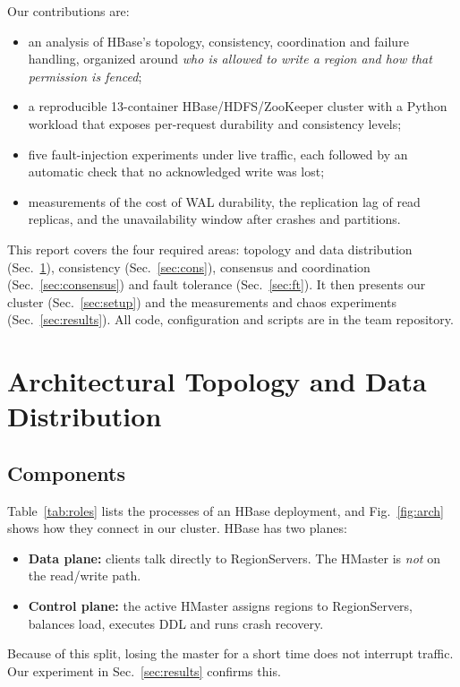 \documentclass[10pt,twocolumn,letterpaper]{article}
\begin{document}
Our contributions are:
\begin{itemize}
\item an analysis of HBase's topology, consistency, coordination and failure handling, organized around \emph{who is allowed to write a region and how that permission is fenced};
\item a reproducible 13-container HBase/HDFS/ZooKeeper cluster with a Python workload that exposes per-request durability and consistency levels;
\item five fault-injection experiments under live traffic, each followed by an automatic check that no acknowledged write was lost;
\item measurements of the cost of WAL durability, the replication lag of read replicas, and the unavailability window after crashes and partitions.
\end{itemize}

This report covers the four required areas: topology and data distribution (Sec.~\ref{sec:topo}), consistency (Sec.~\ref{sec:cons}), consensus and coordination (Sec.~\ref{sec:consensus}) and fault tolerance (Sec.~\ref{sec:ft}). It then presents our cluster (Sec.~\ref{sec:setup}) and the measurements and chaos experiments (Sec.~\ref{sec:results}). All code, configuration and scripts are in the team repository.

\section{Architectural Topology and Data Distribution}\label{sec:topo}

\subsection{Components}
Table~\ref{tab:roles} lists the processes of an HBase deployment, and Fig.~\ref{fig:arch} shows how they connect in our cluster. HBase has two planes:
\begin{itemize}
\item \textbf{Data plane:} clients talk directly to RegionServers. The HMaster is \emph{not} on the read/write path.
\item \textbf{Control plane:} the active HMaster assigns regions to RegionServers, balances load, executes DDL and runs crash recovery.
\end{itemize}
Because of this split, losing the master for a short time does not interrupt traffic. Our experiment in Sec.~\ref{sec:results} confirms this.
\end{document}
